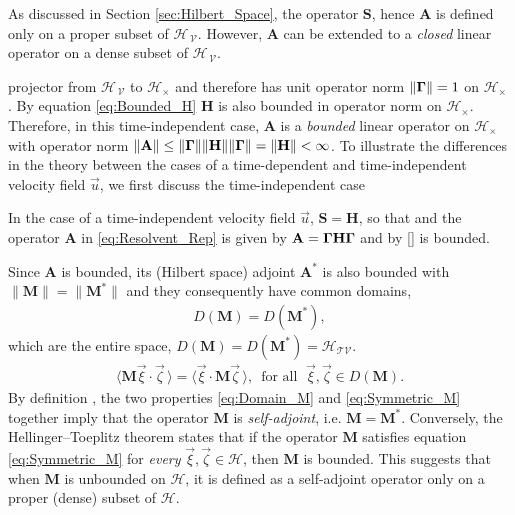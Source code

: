 \documentclass[11pt]{amsart}
\newcommand{\Mb}{\mathbf{M}}
\newcommand{\Hb}{\mathbf{H}}
\newcommand{\Sb}{\mathbf{S}}
\newcommand{\Ab}{\mathbf{A}}
\newcommand{\Tc}{\mathcal{T}}
\newcommand{\Vc}{\mathcal{V}}
\newcommand{\Hs}{\mathscr{H}}
\newcommand\bGamma{\mbox{\boldmath${\Gamma}$}}
\begin{document}
  As discussed in Section
\ref{sec:Hilbert_Space}, the operator $\Sb$, hence $\Ab$ is defined
only on a proper subset of $\Hs_{\,\Vc}$. However, $\Ab$ can be
extended to a \emph{closed} linear operator
\cite{Reed-1980,Stone:64} on a dense subset of $\Hs_{\,\Vc}$.



projector from $\Hs_{\,\Vc}$ to $\Hs_\times$ and therefore has unit
operator norm $\|\bGamma\|=1$ on $\Hs_\times$ 
\cite{Reed-1980,Stone:64}. By equation \eqref{eq:Bounded_H} $\Hb$ is
also bounded in operator norm on $\Hs_\times$.  Therefore, in this
time-independent case, $\Ab$ is a \emph{bounded} linear operator on
$\Hs_\times$ with operator norm $\|\Ab\|\leq\|\bGamma\|\|\Hb\|\|\bGamma\|=\|\Hb\|<\infty$.
To illustrate the
differences in the theory between the cases of a time-dependent and
time-independent velocity field $\vec{u}$, we first discuss the
time-independent case





In the case of a
time-independent velocity field $\vec{u}$, $\Sb=\Hb$, so that and the
operator $\Ab$ in \eqref{eq:Resolvent_Rep} is given by
$\Ab=\bGamma\Hb\bGamma$ and by \eqref{} is bounded.







 Since $\Ab$ is
bounded, its (Hilbert space) adjoint $\Ab^*$ is also bounded with
$\|\Mb\|=\|\Mb^*\|$ \cite{Reed-1980} and they consequently have common
domains,  
%
\begin{align}\label{eq:Domain_M}
  D(\Mb)=D(\Mb^*),
\end{align}
%
which are the entire space, $D(\Mb)=D(\Mb^*)=\Hs_{\Tc\Vc}$. 
%
\begin{align}\label{eq:Symmetric_M}
  \langle\Mb\vec{\xi}\cdot\vec{\zeta}\,\rangle=\langle\vec{\xi}\cdot\Mb\vec{\zeta}\,\rangle,
  \, \text{ for all } \; \vec{\xi},\vec{\zeta}\in D(\Mb).
\end{align}
%
By definition \cite{Reed-1980}, the two properties \eqref{eq:Domain_M}
and \eqref{eq:Symmetric_M} together imply that the operator $\Mb$ is
\emph{self-adjoint}, i.e. $\Mb=\Mb^*$. Conversely, the
Hellinger--Toeplitz theorem \cite{Reed-1980} states that if the
operator $\Mb$ satisfies equation \eqref{eq:Symmetric_M} 
for \emph{every} $\vec{\xi},\vec{\zeta}\in\Hs$, then $\Mb$ is bounded. This
suggests that when $\Mb$ is unbounded on $\Hs$, it is defined as a 
self-adjoint operator only on a proper (dense) subset of $\Hs$. 
\end{document}

